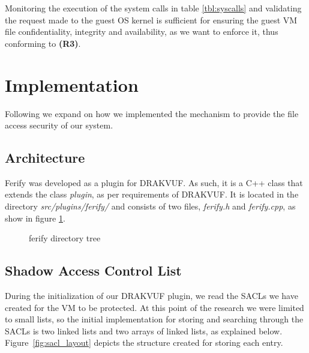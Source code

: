 \par Monitoring the execution of the system calls in table \ref{tbl:syscalls} and validating the request made to the guest \ac{OS} kernel is sufficient for ensuring the guest \ac{VM} file confidentiality, integrity and availability, as we want to enforce it, thus conforming to \textbf{(R3)}.


\section{Implementation}\label{sec:implementation}

\par Following we expand on how we implemented the mechanism to provide the file access security of our system.

\subsection{Architecture}\label{sub:arch}

\par Ferify was developed as a plugin for DRAKVUF. As such, it is a C++ class that extends the class \emph{plugin}, as per requirements of DRAKVUF. It is located in the directory \emph{src/plugins/ferify/} and consists of two files, \emph{ferify.h} and \emph{ferify.cpp}, as show in figure \ref{fig:dir_tree}. 

\begin{figure}[ht]
	\centering
	
	\caption{ferify directory tree}
	\label{fig:dir_tree}
\end{figure}

\subsection{Shadow Access Control List}\label{sub:sacl}
During the initialization of our DRAKVUF plugin, we read the \ac{SACL}s we have created for the \ac{VM} to be protected. At this point of the research we were limited to small lists, so the initial implementation for storing and searching through the \ac{SACL}s is two linked lists and two arrays of linked lists, as explained below. Figure~\ref{fig:sacl_layout} depicts the structure created for storing each entry.

